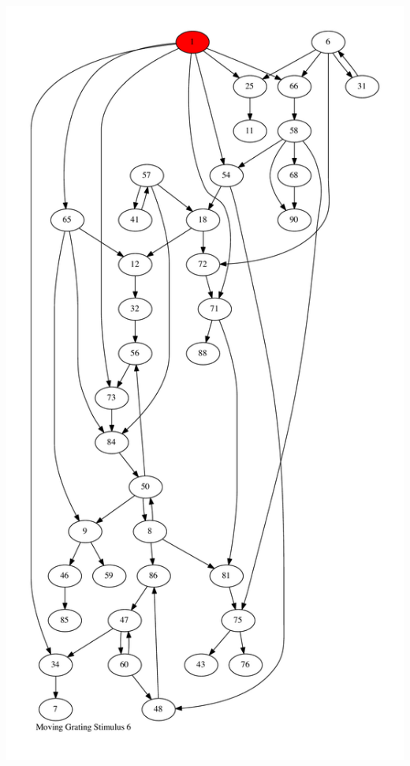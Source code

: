\documentclass{article}
\begin{document}
\newpage
\includegraphics[max height=\textheight,max width=\textwidth]{stim_mov_grat/stim6_pp.pdf}
\end{document}
